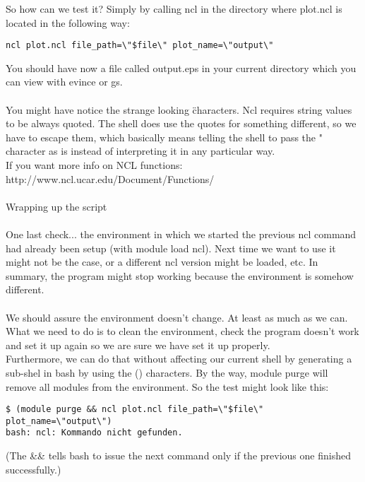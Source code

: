 \documentclass[a4paper,11pt]{ltxdoc}
\begin{document}
So how can we test it? Simply by calling ncl in the directory where plot.ncl is located in the following way:
\begin{verbatim}
ncl plot.ncl file_path=\"$file\" plot_name=\"output\" 
\end{verbatim}
You should have now a file called output.eps in your current directory which you can view with evince or gs. \\
\\
You might have notice the strange looking \" characters. Ncl requires string values to be always quoted. The shell does use the quotes for something different, so we have to escape them, which basically means telling the shell to pass the " character as is instead of interpreting it in any particular way.
\\
If you want more info on NCL functions: http://www.ncl.ucar.edu/Document/Functions/\\
\\
Wrapping up the script\\
\\
One last check... the environment in which we started the previous ncl command had already been setup (with module load ncl). Next time we want to use it might not be the case, or a different ncl version might be loaded, etc. In summary, the program might stop working because the environment is somehow different.\\
\\
We should assure the environment doesn't change. At least as much as we can.\\
What we need to do is to clean the environment, check the program doesn't work and set it up again so we are sure we have set it up properly.\\

Furthermore, we can do that without affecting our current shell by generating a sub-shel in bash by using the () characters.
By the way, module purge will remove all modules from the environment. So the test might look like this:
\begin{verbatim}
$ (module purge && ncl plot.ncl file_path=\"$file\" plot_name=\"output\")
bash: ncl: Kommando nicht gefunden.
\end{verbatim}
(The \&\& tells bash to issue the next command only if the previous one finished successfully.)
\end{document}
